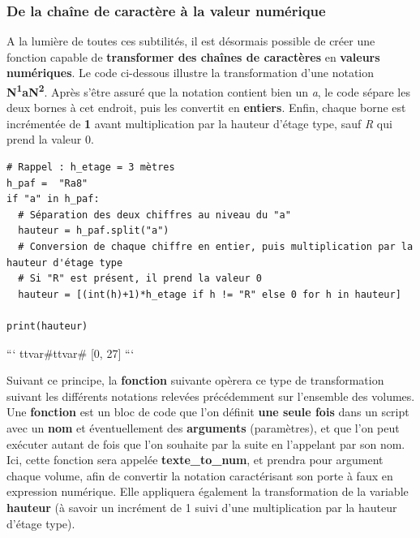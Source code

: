 \documentclass[
  11pt,
  french,
]{article}
\begin{document}
\hypertarget{de-la-chauxeene-de-caractuxe8re-uxe0-la-valeur-numuxe9rique}{%
\subsubsection{De la chaîne de caractère à la valeur
numérique}\label{de-la-chauxeene-de-caractuxe8re-uxe0-la-valeur-numuxe9rique}}

A la lumière de toutes ces subtilités, il est désormais possible de
créer une fonction capable de \textbf{transformer des chaînes de
caractères} en \textbf{valeurs numériques}. Le code ci-dessous illustre
la transformation d'une notation
\textbf{N\textsuperscript{1}aN\textsuperscript{2}}. Après s'être assuré
que la notation contient bien un \emph{a}, le code sépare les deux
bornes à cet endroit, puis les convertit en \textbf{entiers}. Enfin,
chaque borne est incrémentée de \textbf{1} avant multiplication par la
hauteur d'étage type, sauf \emph{R} qui prend la valeur 0.

\begin{tcolorbox}[title= Aperçu des différentes notations caractérisant les porte à faux ,colback=boitecode]
\begin{lstlisting}[style=code]
# Rappel : h_etage = 3 mètres
h_paf =  "Ra8"
if "a" in h_paf:
  # Séparation des deux chiffres au niveau du "a"
  hauteur = h_paf.split("a")
  # Conversion de chaque chiffre en entier, puis multiplication par la hauteur d'étage type
  # Si "R" est présent, il prend la valeur 0
  hauteur = [(int(h)+1)*h_etage if h != "R" else 0 for h in hauteur]

print(hauteur)\end{lstlisting}

```
ttvar{#}ttvar{#} [0, 27]
```

\end{tcolorbox}

Suivant ce principe, la \textbf{fonction} suivante opèrera ce type de
transformation suivant les différents notations relevées précédemment
sur l'ensemble des volumes. Une \textbf{fonction} est un bloc de code
que l'on définit \textbf{une seule fois} dans un script avec un
\textbf{nom} et éventuellement des \textbf{arguments} (paramètres), et
que l'on peut exécuter autant de fois que l'on souhaite par la suite en
l'appelant par son nom. Ici, cette fonction sera appelée
\textbf{texte\_to\_num}, et prendra pour argument chaque volume, afin de
convertir la notation caractérisant son porte à faux en expression
numérique. Elle appliquera également la transformation de la variable
\textbf{hauteur} (à savoir un incrément de 1 suivi d'une multiplication
par la hauteur d'étage type).
\end{document}
